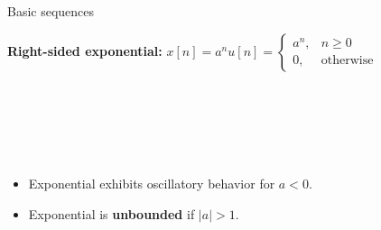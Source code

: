 \documentclass[10pt, aspectratio=169]{beamer}
\begin{document}
%
\begin{frame}{Basic sequences}
	
\textbf{Right-sided exponential:} $\displaystyle 
x[n] = a^nu[n] = \begin{cases}
a^n, & n \geq 0 \\
0, & \text{otherwise}
\end{cases}$
	
\begin{figure}[h!] 
	\centering 
	\begin{subfigure}[h!]{0.25\textwidth} 
	\end{subfigure}%
	~ %
	\begin{subfigure}[h!]{0.25\textwidth} 
\end{subfigure}%
	~ %
	\begin{subfigure}[h!]{0.25\textwidth} 
	\end{subfigure}%
	~ %
	\begin{subfigure}[h!]{0.25\textwidth} 
	\end{subfigure}%
\end{figure}

\begin{itemize}
	\item Exponential exhibits oscillatory behavior for $a < 0$.
	\item Exponential is \textbf{unbounded} if $|a| > 1$.
\end{itemize}
\end{frame}
\end{document}
